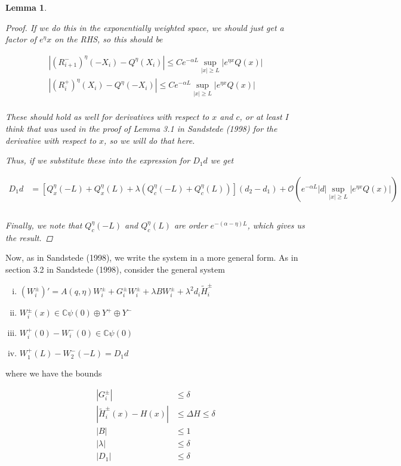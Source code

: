 \documentclass[12pt]{article}
\def\C{{\mathbb C}}
\newtheorem{lemma}{Lemma}
\begin{document}
\begin{lemma}
\begin{proof}
If we do this in the exponentially weighted space, we should just get a factor of $e^\eta x$ on the RHS, so this should be

\begin{align*}
|(R_{i+1}^-)^\eta(-X_i) - Q^\eta(X_i)| \leq C e^{-\alpha L} \sup_{|x| \geq L} |e^{\eta x} Q(x)| \\
|(R_{i}^+)^\eta(X_i) - Q^\eta(-X_i)| \leq C e^{-\alpha L} \sup_{|x| \geq L} |e^{\eta x} Q(x)| \\
\end{align*}

These should hold as well for derivatives with respect to $x$ and $c$, or at least I think that was used in the proof of Lemma 3.1 in Sandstede (1998) for the derivative with respect to $x$, so we will do that here. 

Thus, if we substitute these into the expression for $D_1 d$ we get

\begin{align*}
D_1 d &= [Q^\eta_x(-L) + Q^\eta_x(L) + 
\lambda(Q^\eta_c(-L) + Q^\eta_c(L))](d_2 - d_1) + \mathcal{O}\left(e^{-\alpha L} |d| \sup_{|x| \geq L} |e^{\eta x} Q(x)| \right) \\ \\
\end{align*}

Finally, we note that $Q^\eta_c(-L)$ and $Q^\eta_c(L)$ are order $e^{-(\alpha - \eta)L}$, which gives us the result.

\end{proof}
\end{lemma}

Now, as in Sandstede (1998), we write the system in a more general form. As in section 3.2 in Sandstede (1998), consider the general system

\begin{enumerate}[(i)]
\item $(W_i^\pm)' = A(q, \eta) W_i^\pm + G_i^\pm W_i^\pm + \lambda B W_i^\pm + \lambda^2 d_i \tilde{H}_i^\pm$
\item $W_i^\pm(x) \in \C \psi(0) \oplus Y^+ \oplus Y^-$
\item $W_i^+(0) - W_i^-(0) \in \C \psi(0) $
\item $W_1^+(L) - W_2^-(-L) = D_1 d $
\end{enumerate}

where we have the bounds 

\begin{align*}
|G_i^\pm| & \leq \delta \\
|\tilde{H}_i^\pm(x) - H(x)| &\leq \Delta H \leq \delta\\
|B| &\leq 1 \\
|\lambda| &\leq \delta \\
|D_1| &\leq \delta
\end{align*}
\end{document}
